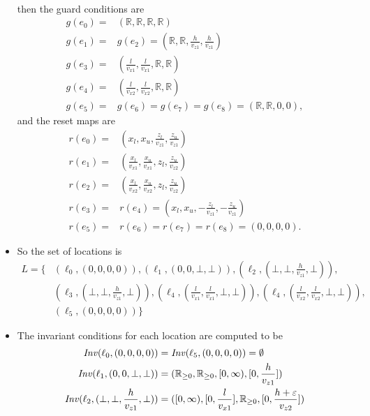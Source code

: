 \begin{ex}
\begin{itemize}
\begin{align*}
    \end{align*}
    then the guard conditions are
    \begin{align*}
        g(e_{0})= & (\mathbb{R},\mathbb{R},\mathbb{R},\mathbb{R}) \\
        g(e_{1})= & g(e_{2}) = (\mathbb{R},\mathbb{R},\frac{h}{v_{z1}},\frac{h}{v_{z1}}) \\
        g(e_{3})= & (\frac{l}{v_{x1}}, \frac{l}{v_{x1}}, \mathbb{R},\mathbb{R}) \\
        g(e_{4})= & (\frac{l}{v_{x2}}, \frac{l}{v_{x2}}, \mathbb{R},\mathbb{R}) \\
        g(e_{5})= & g(e_{6})=g(e_{7})=g(e_{8})=(\mathbb{R},\mathbb{R},0,0),
    \end{align*}
    and the reset maps are
    \begin{align*}
        r(e_{0})=&(x_{l},x_{u},\frac{z_{l}}{v_{z1}},\frac{z_{u}}{v_{z1}})\\
        r(e_{1})=&(\frac{x_{l}}{v_{x1}},\frac{x_{u}}{v_{x1}},z_{l},\frac{z_{u}}{v_{z2}}) \\
        r(e_{2})=&(\frac{x_{l}}{v_{x2}},\frac{x_{u}}{v_{x2}},z_{l},\frac{z_{u}}{v_{z2}}) \\
        r(e_{3})=&r(e_{4})=(x_{l},x_{u},-\frac{z_{l}}{v_{z1}},-\frac{z_{u}}{v_{z1}})\\
        r(e_{5})=&r(e_{6})=r(e_{7})=r(e_{8})=(0,0,0,0).
    \end{align*}
    \item So the set of locations is
    \begin{align*}
        L=\{&(\ell_{0},(0,0,0,0)),(\ell_{1},(0,0,\bot,\bot)),(\ell_{2},(\bot,\bot,\frac{h}{v_{z1}},\bot)),\\
        &(\ell_{3},(\bot,\bot,\frac{h}{v_{z1}},\bot)),(\ell_{4},(\frac{l}{v_{x1}},\frac{l}{v_{x1}},\bot,\bot)),(\ell_{4},(\frac{l}{v_{x2}},\frac{l}{v_{x2}},\bot,\bot)),\\
        &(\ell_{5},(0,0,0,0))\}
    \end{align*}
    \item The invariant conditions for each location are computed to be
    \begin{align*}
            \Inv(\ell_{0},(0,0,0,0))&=\Inv(\ell_{5},(0,0,0,0))=\emptyset \\
            \Inv(\ell_{1},(0,0,\bot,\bot))&=(\mathbb{R}_{\geq0},\mathbb{R}_{\geq0},[0,\infty),[0,\frac{h}{v_{z1}}]) \\
            \Inv(\ell_{2},(\bot,\bot,\frac{h}{v_{z1}},\bot))&=([0,\infty),[0,\frac{l}{v_{x1}}],\mathbb{R}_{\geq0},[0,\frac{h+\varepsilon}{v_{z2}}]) \\

\end{align*}
\end{itemize}
\end{ex}
